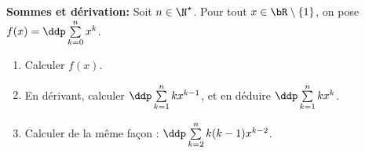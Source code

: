 
\begin{exercice}  \; \textbf{Sommes et d\'erivation:} Soit $n\in\N^{\star}$. Pour tout $x\in\bR\setminus\lbrace 1\rbrace$, on pose $f(x)=\ddp \sum\limits_{k=0}^n x^k$.
\begin{enumerate}
\item Calculer $f(x)$.
\item En d\'erivant, calculer $\ddp \sum\limits_{k=1}^n kx^{k-1}$, et en d\'eduire $\ddp \sum\limits_{k=1}^n kx^k$.
\item Calculer de la m\^eme fa\c con : $\ddp \sum\limits_{k=2}^n k(k-1)x^{k-2}$.
\end{enumerate}

\end{exercice}